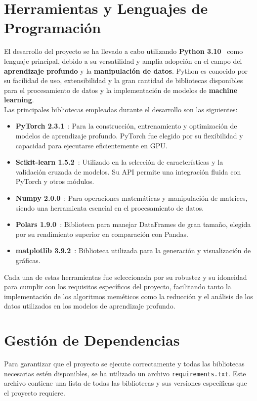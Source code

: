 \section{Herramientas y Lenguajes de Programación}\label{sec:herramientas-y-lenguajes-de-programacion}
El desarrollo del proyecto se ha llevado a cabo utilizando \textbf{Python 3.10}~\cite{} como lenguaje principal,
debido a su versatilidad y amplia adopción en el campo del \textbf{aprendizaje profundo} y la
\textbf{manipulación de datos}.
Python es conocido por su facilidad de uso, extensibilidad y la gran cantidad de bibliotecas disponibles para el
procesamiento de datos y la implementación de modelos de \textbf{machine learning}. \\[6pt]

Las principales bibliotecas empleadas durante el desarrollo son las siguientes:
\begin{itemize}
    \item \textbf{PyTorch 2.3.1}~\cite{}: Para la construcción, entrenamiento y optimización de modelos de aprendizaje
    profundo.
    PyTorch fue elegido por su flexibilidad y capacidad para ejecutarse eficientemente en GPU\@.
    \item \textbf{Scikit-learn 1.5.2}~\cite{}: Utilizado en la selección de características y la validación cruzada de
    modelos.
    Su API permite una integración fluida con PyTorch y otros módulos.
    \item \textbf{Numpy 2.0.0}~\cite{}: Para operaciones matemáticas y manipulación de matrices, siendo una herramienta
    esencial en el procesamiento de datos.
    \item \textbf{Polars 1.9.0}~\cite{}: Biblioteca para manejar DataFrames de gran tamaño, elegida por su rendimiento
    superior en comparación con Pandas.
    \item \textbf{matplotlib 3.9.2}~\cite{}: Biblioteca utilizada para la generación y visualización de gráficas.
\end{itemize}

Cada una de estas herramientas fue seleccionada por su robustez y su idoneidad para cumplir con los requisitos
específicos del proyecto, facilitando tanto la implementación de los algoritmos meméticos como la reducción y el
análisis de los datos utilizados en los modelos de aprendizaje profundo. \\[6pt]

\section{Gestión de Dependencias}\label{sec:gestion-de-dependencias}
Para garantizar que el proyecto se ejecute correctamente y todas las bibliotecas necesarias estén disponibles, se ha
utilizado un archivo \texttt{requirements.txt}.
Este archivo contiene una lista de todas las bibliotecas y sus versiones específicas que el proyecto requiere. \\[6pt]

